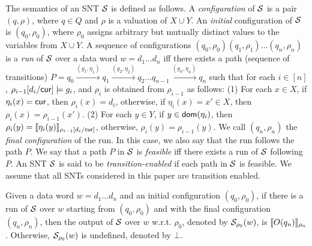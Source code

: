 The semantics of an SNT ${\mathcal{S} }$  is defined as follows. A \emph{configuration} of ${\mathcal{S} }$ is a pair $(q,\rho)$, where $q \in Q$ and $\rho$ is a valuation of $X \cup Y$. An \emph{initial} configuration of ${\mathcal{S} }$ is $(q_0,\rho_0)$, where $\rho_0$ assigns arbitrary but mutually distinct values to the variables from $X\cup Y$.
A sequence of configurations $(q_0,\rho_0)(q_1,\rho_1)\ldots(q_n,\rho_n)$ is
a \emph{run} of ${\mathcal{S} }$ over a data word $w=d_1 \dots d_n$ iff there exists a path (sequence of transitions) $P=q_0 \xrightarrow{(g_1,\eta_1)} q_1 \xrightarrow{(g_2,\eta_2)} q_2 \dots q_{n-1} \xrightarrow{(g_n, \eta_n)} q_n$ such that for each $i \in [n]$, $\rho_{i-1}[d_i/\mathsf{cur}] \models g_i$, and $\rho_i$ is obtained from $\rho_{i-1}$ as follows: (1) For each $x \in X$, if $\eta_i(x)=\mathsf{cur}$, then $\rho_i(x)=d_i$, otherwise, if $\eta_i(x)=x' \in X$, then $\rho_i(x)=\rho_{i-1}(x')$. (2) For each $y \in Y$, if $y \in \mathsf{dom}(\eta_i)$, then $\rho_i(y)=\llbracket\eta_i(y)\rrbracket_{\rho_{i-1}[d_i/\mathsf{cur}]}$, otherwise, $\rho_i(y)=\rho_{i-1}(y)$.
We call $(q_n,\rho_n)$ the \emph{final configuration} of the run. In this case, we also say that the run follows the path $P$.
We say that a path $P$ in ${\mathcal{S} }$ is \emph{feasible} iff there exists a run of ${\mathcal{S} }$ following $P$. 
An SNT ${\mathcal{S} }$ is said to be \emph{transition-enabled} if each path in ${\mathcal{S} }$ is feasible. We assume that all SNTs considered in this paper are transition enabled.


Given a data word $w = d_1 \dots d_n$ and an initial configuration $(q_0, \rho_0)$, if there is a run of ${\mathcal{S} }$ over $w$ starting from $(q_0,\rho_0)$ and with the final configuration $(q_n,\rho_n)$, then the output of ${\mathcal{S} }$ over $w$ w.r.t. $\rho_0$, denoted by ${{\mathcal{S} }}_{\rho_0}(w)$, is $\llbracket O(q_n)\rrbracket_{\rho_n}$. Otherwise, ${{\mathcal{S} }}_{\rho_0}(w)$ is undefined, denoted by $\bot$. 


